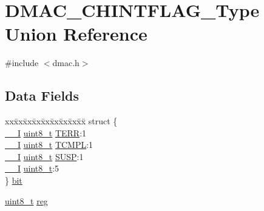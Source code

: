 \hypertarget{union_d_m_a_c___c_h_i_n_t_f_l_a_g___type}{}\section{D\+M\+A\+C\+\_\+\+C\+H\+I\+N\+T\+F\+L\+A\+G\+\_\+\+Type Union Reference}
\label{union_d_m_a_c___c_h_i_n_t_f_l_a_g___type}


{\ttfamily \#include $<$dmac.\+h$>$}

\subsection*{Data Fields}
\begin{DoxyCompactItemize}
\item 
\begin{tabbing}
xx\=xx\=xx\=xx\=xx\=xx\=xx\=xx\=xx\=\kill
struct \{\\
\>\mbox{\hyperlink{core__cm0plus_8h_af63697ed9952cc71e1225efe205f6cd3}{\_\_I}} \mbox{\hyperlink{union_d_m_a_c___c_h_i_n_t_f_l_a_g___type_a5b4208c6f4c4a4290c4f2804d1eb1d5b}{uint8\_t}} \mbox{\hyperlink{union_d_m_a_c___c_h_i_n_t_f_l_a_g___type_a46f0d638374cee22497a02cbf652b52b}{TERR}}:1\\
\>\mbox{\hyperlink{core__cm0plus_8h_af63697ed9952cc71e1225efe205f6cd3}{\_\_I}} \mbox{\hyperlink{union_d_m_a_c___c_h_i_n_t_f_l_a_g___type_a5b4208c6f4c4a4290c4f2804d1eb1d5b}{uint8\_t}} \mbox{\hyperlink{union_d_m_a_c___c_h_i_n_t_f_l_a_g___type_a0f36357f544b869ce8003411a214d5c3}{TCMPL}}:1\\
\>\mbox{\hyperlink{core__cm0plus_8h_af63697ed9952cc71e1225efe205f6cd3}{\_\_I}} \mbox{\hyperlink{union_d_m_a_c___c_h_i_n_t_f_l_a_g___type_a5b4208c6f4c4a4290c4f2804d1eb1d5b}{uint8\_t}} \mbox{\hyperlink{union_d_m_a_c___c_h_i_n_t_f_l_a_g___type_a98cfd2c141cd23180ddb0d5e7f9f7aa6}{SUSP}}:1\\
\>\mbox{\hyperlink{core__cm0plus_8h_af63697ed9952cc71e1225efe205f6cd3}{\_\_I}} \mbox{\hyperlink{union_d_m_a_c___c_h_i_n_t_f_l_a_g___type_a5b4208c6f4c4a4290c4f2804d1eb1d5b}{uint8\_t}}:5\\
\} \mbox{\hyperlink{union_d_m_a_c___c_h_i_n_t_f_l_a_g___type_a6959c948069303e35e49450df876e8bc}{bit}}\\

\end{tabbing}\item 
\mbox{\hyperlink{union_d_m_a_c___c_h_i_n_t_f_l_a_g___type_a5b4208c6f4c4a4290c4f2804d1eb1d5b}{uint8\+\_\+t}} \mbox{\hyperlink{union_d_m_a_c___c_h_i_n_t_f_l_a_g___type_a9428adc9af4653a2050e2536b55dec8d}{reg}}
\end{DoxyCompactItemize}


